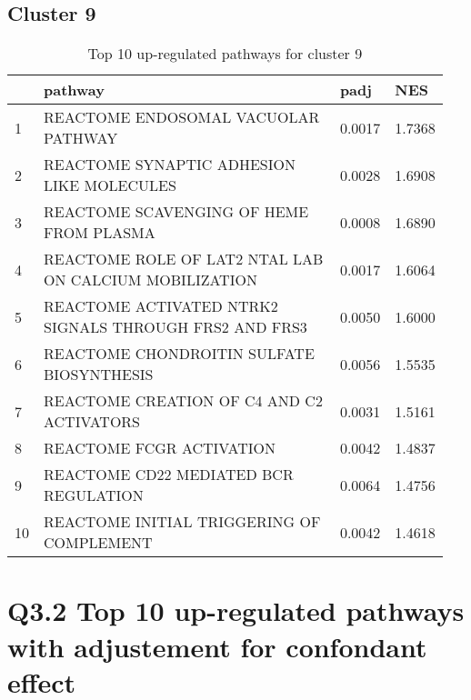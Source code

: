 \documentclass{article}
\begin{document}
\subsection{Cluster 9 }
\begin{table}[H]
\centering
\begin{tabular}{p{0.05\linewidth}p{0.7\linewidth}p{0.1\linewidth}p{0.1\linewidth}}
  \hline
 & pathway & padj & NES \\ 
  \hline
1 & REACTOME ENDOSOMAL VACUOLAR PATHWAY & 0.0017 & 1.7368 \\ 
  2 & REACTOME SYNAPTIC ADHESION LIKE MOLECULES & 0.0028 & 1.6908 \\ 
  3 & REACTOME SCAVENGING OF HEME FROM PLASMA & 0.0008 & 1.6890 \\ 
  4 & REACTOME ROLE OF LAT2 NTAL LAB ON CALCIUM MOBILIZATION & 0.0017 & 1.6064 \\ 
  5 & REACTOME ACTIVATED NTRK2 SIGNALS THROUGH FRS2 AND FRS3 & 0.0050 & 1.6000 \\ 
  6 & REACTOME CHONDROITIN SULFATE BIOSYNTHESIS & 0.0056 & 1.5535 \\ 
  7 & REACTOME CREATION OF C4 AND C2 ACTIVATORS & 0.0031 & 1.5161 \\ 
  8 & REACTOME FCGR ACTIVATION & 0.0042 & 1.4837 \\ 
  9 & REACTOME CD22 MEDIATED BCR REGULATION & 0.0064 & 1.4756 \\ 
  10 & REACTOME INITIAL TRIGGERING OF COMPLEMENT & 0.0042 & 1.4618 \\ 
   \hline
\end{tabular}
\caption{Top 10 up-regulated pathways for cluster 9} 
\label{tab:q3_2_9}
\end{table}
\section{Q3.2 Top 10 up-regulated pathways with adjustement for confondant effect}
\end{document}
